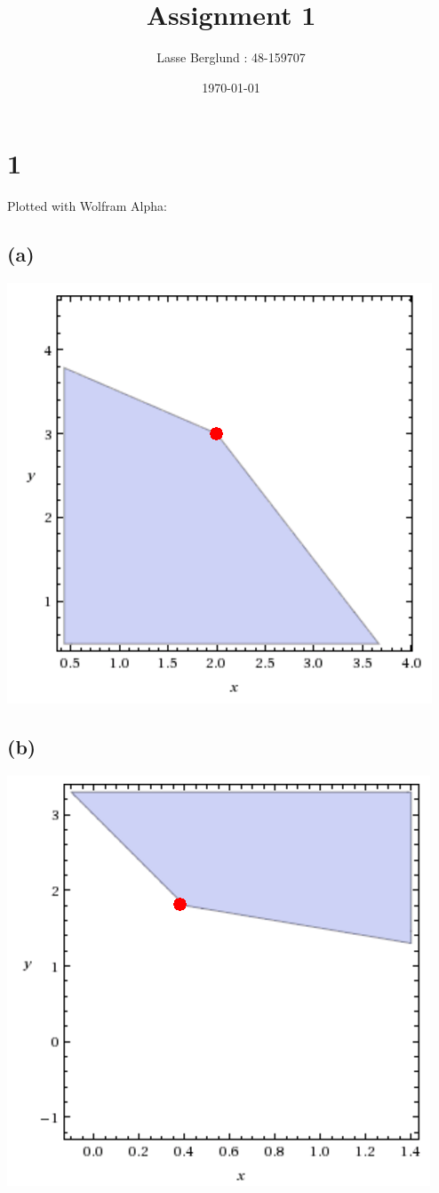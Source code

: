 \documentclass[12pt]{report}
\title{Assignment 1}
\author{Lasse Berglund : 48-159707}
\date{\today}
\begin{document}
\maketitle
\section*{1}
Plotted with Wolfram Alpha:

\subsection*{(a)}
\includegraphics[scale=0.35]{1_a}\\ 
\subsection*{(b)}
\includegraphics[scale=0.35]{1_b}
\end{document}
